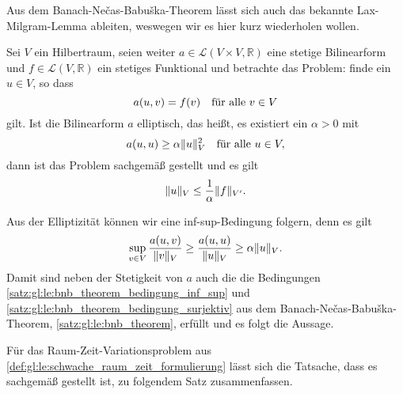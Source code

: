 Aus dem Banach-Ne{\v c}as-Babu{\v s}ka-Theorem lässt sich auch das bekannte Lax-Milgram-Lemma ableiten, weswegen wir es hier kurz wiederholen wollen.

\begin{Lemma}
\label{lem:gl:le:lax_milgram}
    Sei $V$ ein Hilbertraum, seien weiter $a \in \mathcal L(V \times V, \mathbb{R})$ eine stetige Bilinearform und $f \in \mathcal L (V, \mathbb{R})$ ein stetiges Funktional und betrachte das Problem:
    finde ein $u \in V$, so dass
    \begin{equation}
        a(u, v) = f(v) \quad \fa v \in V
    \end{equation}
    gilt.
    Ist die Bilinearform $a$ elliptisch, das heißt, es existiert ein $\alpha > 0$ mit
    \begin{equation}
    \label{eq:gl:le:lax_milgram_elliptisch}
        a(u, u) \geq \alpha \norm{u}_{V}^{2} \quad \fa u \in V,
    \end{equation}
    dann ist das Problem sachgemäß gestellt und es gilt
    \begin{equation}
        \norm{u}_{V} \leq \frac{1}{\alpha} \norm{f}_{V'}.
    \end{equation}

    \begin{Beweis}
        Aus der Elliptizität können wir eine inf-sup-Bedingung folgern, denn es gilt
        \begin{equation}
            \sup_{v \in V} \frac{a(u, v)}{\norm{v}_{V}} \geq \frac{a(u, u)}{\norm{u}_{V}} \geq \alpha \norm{u}_{V}.
        \end{equation}
        Damit sind neben der Stetigkeit von $a$ auch die die Bedingungen \ref{satz:gl:le:bnb_theorem_bedingung_inf_sup} und \ref{satz:gl:le:bnb_theorem_bedingung_surjektiv} aus dem Banach-Ne{\v c}as-Babu{\v s}ka-Theorem, \cref{satz:gl:le:bnb_theorem}, erfüllt und es folgt die Aussage.
    \end{Beweis}
\end{Lemma}

Für das Raum-Zeit-Variationsproblem aus \cref{def:gl:le:schwache_raum_zeit_formulierung} lässt sich die Tatsache, dass es sachgemäß gestellt ist, zu folgendem Satz zusammenfassen.

